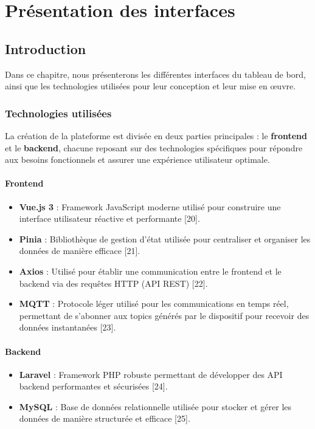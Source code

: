 \chapter{Présentation des interfaces}
\section{Introduction}
Dans ce chapitre, nous présenterons les différentes interfaces du tableau de bord, ainsi que les technologies utilisées pour leur conception et leur mise en œuvre.

\subsection{Technologies utilisées}

La création de la plateforme est divisée en deux parties principales : le \textbf{frontend} et le \textbf{backend}, chacune reposant sur des technologies spécifiques pour répondre aux besoins fonctionnels et assurer une expérience utilisateur optimale.

\subsubsection{Frontend}
\begin{itemize}
	\item \textbf{Vue.js 3} : Framework JavaScript moderne utilisé pour construire une interface utilisateur réactive et performante [20].
	\item \textbf{Pinia} : Bibliothèque de gestion d'état utilisée pour centraliser et organiser les données de manière efficace [21].
	\item \textbf{Axios} : Utilisé pour établir une communication entre le frontend et le backend via des requêtes HTTP (API REST) [22].
	\item \textbf{MQTT} : Protocole léger utilisé pour les communications en temps réel, permettant de s'abonner aux topics générés par le dispositif pour recevoir des données instantanées [23].
\end{itemize}

\subsubsection{Backend}
\begin{itemize}
	\item \textbf{Laravel} : Framework PHP robuste permettant de développer des API backend performantes et sécurisées [24].
	\item \textbf{MySQL} : Base de données relationnelle utilisée pour stocker et gérer les données de manière structurée et efficace [25].
\end{itemize}

